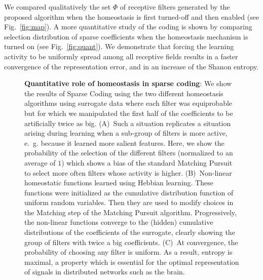 \documentclass[a4paper, 11pt, draft]{article} %
\newcommand{\dico}{\Phi} %
\begin{document}
We compared qualitatively the set $\dico$ of receptive filters generated by the proposed algorithm when the homeostasis is first turned-off and then enabled  (see Fig.~\ref{fig:map}). A more quantitative study of the coding is shown by comparing selection distribution of sparse coefficients when the homeostasis mechanism is turned on (see Fig.~\ref{fig:quant}). We demonstrate that forcing the learning activity to be uniformly spread among all receptive fields results in a faster convergence of the representation error, and in an increase of the Shanon entropy. 
\begin{figure}[!ht]%
\caption{
{\bf Quantitative role of homeostasis in sparse coding}: We show the results of Sparse Coding using the two different homeostasis algorithms using surrogate data where each filter was equiprobable but for which we manipulated the first half of the coefficients to be artificially twice as big. %
{\sf (A)}~Such a situation replicates a situation arising during learning when a sub-group of filters is more active, e.~g. because it learned more salient features.  Here, we show the probability of the selection of the different filters (normalized to an average of $1$) which shows a bias of the standard Matching Pursuit to select more often filters whose activity is higher. %
{\sf (B)}~Non-linear homeostatic functions learned using Hebbian learning. These functions were initialized as the cumulative distribution function of uniform random variables. Then they are used to modify choices in the Matching step of the Matching Pursuit algorithm. Progressively, the non-linear functions converge to the (hidden) cumulative distributions of the coefficients of the surrogate, clearly showing the group of filters with twice a big coefficients. 
 {\sf (C)}~At convergence, the probability of choosing any filter is uniform. As a result, entropy is maximal, a property which is essential for the optimal representation of signals in distributed networks such as the brain.
\label{fig:HEH}}%
\end{figure}%
\end{document}
